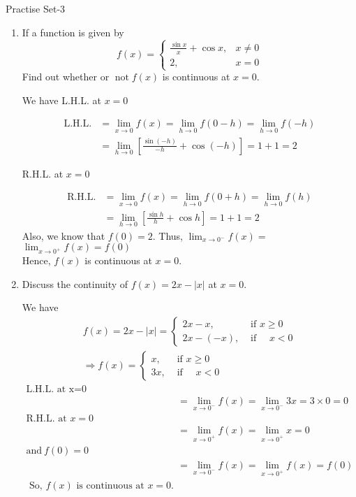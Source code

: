 \newpage\begin{abox}
	Practise Set-3
\end{abox}
\begin{enumerate}
	\item If a function is given by
	$$
	f(x)=\left\{\begin{array}{cl}
	\frac{\sin x}{x}+\cos x, & x \neq 0 \\
	2, & x=0
	\end{array}\right.
	$$
	Find out whether or $\operatorname{not} f(x)$ is continuous at $x=0$.
	\begin{answer}
		We have
		L.H.L. at $x=0$
		
		\begin{align*}
		\text{L.H.L.}&=\lim _{x \rightarrow 0} f(x)=\lim _{h \rightarrow 0} f(0-h)=\lim _{h \rightarrow 0} f(-h) \\
		&=\lim _{h \rightarrow 0}\left[\frac{\sin (-h)}{-h}+\cos (-h)\right]=1+1=2
		\end{align*}
		
		R.H.L. at $x=0$
		
		\begin{align*}
		\text{R.H.L.}&=\lim _{x \rightarrow 0} f(x)=\lim _{h \rightarrow 0} f(0+h)=\lim _{h \rightarrow 0} f(h) \\
		&=\lim _{h \rightarrow 0}\left[\frac{\sin h}{h}+\cos h\right]=1+1=2
		\end{align*}
		Also, we know that $f(0)=2 .$ Thus, $\lim _{x \rightarrow 0^{-}} f(x)=$ $\lim _{x \rightarrow 0^{+}} f(x)=f(0)$
		\\Hence, $f(x)$ is continuous at $x=0$.
		
	\end{answer}
	\item Discuss the continuity of $f(x)=2 x-|x|$ at $x=0$.
	\begin{answer}
		We have
		$$
		\begin{array}{c}
		f(x)=2 x-|x|=\left\{\begin{aligned}
		2 x-x, & \text { if } x \geq 0 \\
		2 x-(-x), & \text { if } \quad x<0
		\end{aligned}\right. \\
		\Rightarrow f(x)=\left\{\begin{aligned}
		x, & \text { if } x \geq 0 \\
		3 x, & \text { if } \quad x<0
		\end{aligned}\right.
		\end{array}
		$$
		\begin{align*}
		\text{L.H.L. at x=0}\\
		&=\lim _{x \rightarrow 0^{-}} f(x)=\lim _{x \rightarrow 0^{-}} 3 x=3 \times 0=0\\
		\text{R.H.L. at }x=0\\
		&=\lim _{x \rightarrow 0^{+}} f(x)=\lim _{x \rightarrow 0^{+}}x=0\\
		\text{and}\ f(0)=0\\
		&=\lim _{x \rightarrow 0^{-}} f(x)=\lim _{x \rightarrow 0^{+}} f(x)=f(0)\\
		\text{	So, $f(x)$ is continuous at $x=0$.}
		\end{align*}
		

\end{answer}
\end{enumerate}
